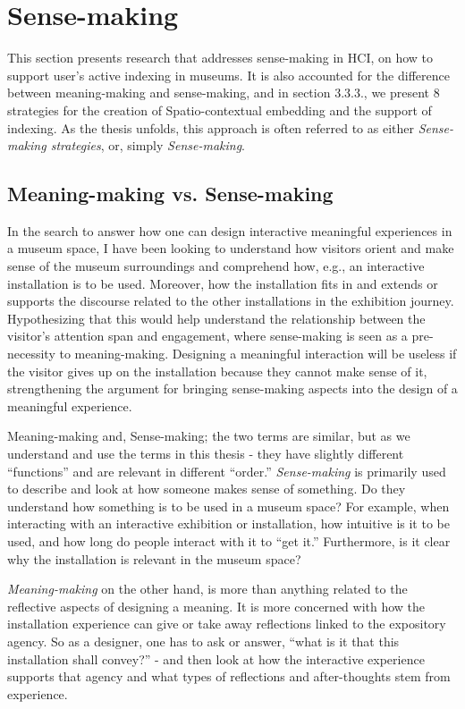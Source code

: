 \break
\section{Sense-making}
This section presents research that addresses sense-making in HCI, on how to support user’s active indexing in museums. It is also accounted for the difference between meaning-making and sense-making, and in section 3.3.3., we present 8 strategies for the creation of Spatio-contextual embedding and the support of indexing. As the thesis unfolds, this approach is often referred to as either \emph{Sense-making strategies}, or, simply \emph{Sense-making}.

\subsection{Meaning-making vs. Sense-making}
In the search to answer how one can design interactive meaningful experiences in a museum space, I have been looking to understand how visitors orient and make sense of the museum surroundings and comprehend how, e.g., an interactive installation is to be used. Moreover, how the installation fits in and extends or supports the discourse related to the other installations in the exhibition journey. Hypothesizing that this would help understand the relationship between the visitor's attention span and engagement, where sense-making is seen as a pre-necessity to meaning-making. Designing a meaningful interaction will be useless if the visitor gives up on the installation because they cannot make sense of it, strengthening the argument for bringing sense-making aspects into the design of a meaningful experience.

Meaning-making and, Sense-making; the two terms are similar, but as we understand and use the terms in this thesis - they have slightly different “functions” and are relevant in different “order.” \emph{Sense-making} is primarily used to describe and look at how someone makes sense of something. Do they understand how something is to be used in a museum space? For example, when interacting with an interactive exhibition or installation, how intuitive is it to be used, and how long do people interact with it to “get it.” Furthermore, is it clear why the installation is relevant in the museum space? 

\emph{Meaning-making} on the other hand, is more than anything related to the reflective aspects of designing a meaning. It is more concerned with how the installation experience can give or take away reflections linked to the expository agency. So as a designer, one has to ask or answer, “what is it that this installation shall convey?” - and then look at how the interactive experience supports that agency and what types of reflections and after-thoughts stem from experience.

